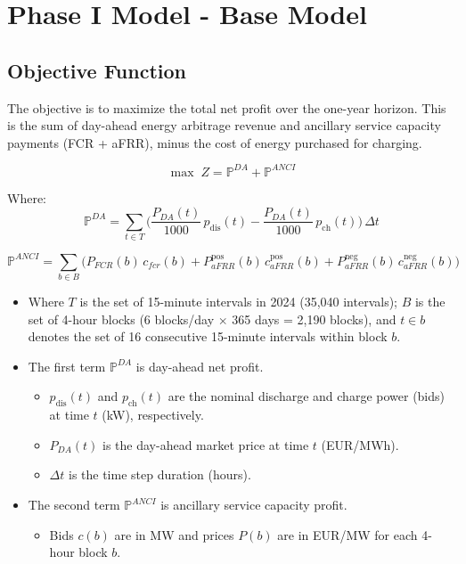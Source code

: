 \documentclass[11pt, a4paper]{article}
\begin{document}
\section{Phase I Model - Base Model}

\subsection*{Objective Function}

The objective is to maximize the total net profit over the one-year horizon. This is the sum of day-ahead energy arbitrage revenue and ancillary service capacity payments (FCR + aFRR), minus the cost of energy purchased for charging.

\begin{equation}
\max \; Z = \mathbb{P}^{DA} + \mathbb{P}^{ANCI}  
\end{equation}

Where:
\begin{equation}
\mathbb{P}^{DA} = \sum_{t\in T} \Bigg( \frac{P_{DA}(t)}{1000}\, p_{\mathrm{dis}}(t) - \frac{P_{DA}(t)}{1000}\, p_{\mathrm{ch}}(t) \Bigg)\, \Delta t    
\end{equation}

\begin{equation}
\mathbb{P}^{ANCI} = \sum_{b\in B} \Big( P_{FCR}(b)\, c_{fcr}(b) + P^{\mathrm{pos}}_{aFRR}(b)\, c^{\mathrm{pos}}_{aFRR}(b) + P^{\mathrm{neg}}_{aFRR}(b)\, c^{\mathrm{neg}}_{aFRR}(b) \Big)
\end{equation}

\begin{itemize}
  \item Where $T$ is the set of 15-minute intervals in 2024 (35,040 intervals); $B$ is the set of 4-hour blocks (6 blocks/day $\times$ 365 days = 2,190 blocks), and $t \in b$ denotes the set of 16 consecutive 15-minute intervals within block $b$.
  \item The first term $\mathbb{P}^{DA}$ is day-ahead net profit.
  \begin{itemize}
    \item $p_{\mathrm{dis}}(t)$ and $p_{\mathrm{ch}}(t)$ are the nominal discharge and charge power (bids) at time $t$ (kW), respectively.
    \item $P_{DA}(t)$ is the day-ahead market price at time $t$ (EUR/MWh).
    \item $\Delta t$ is the time step duration (hours).
  \end{itemize}
  \item The second term $\mathbb{P}^{ANCI}$ is ancillary service capacity profit.
  \begin{itemize}
    \item Bids $c(b)$ are in MW and prices $P(b)$ are in EUR/MW for each 4-hour block $b$.
  \end{itemize}
\end{itemize}
\end{document}
